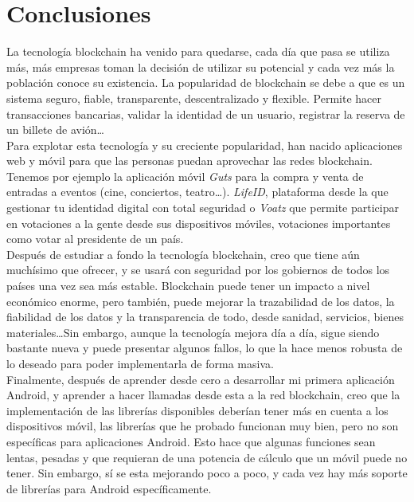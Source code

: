 \chapter{Conclusiones}
\label{cap:Conclusiones}

La tecnología blockchain ha venido para quedarse, cada día que pasa se utiliza más, más empresas toman la decisión de utilizar su potencial y cada vez más la población conoce su existencia. La popularidad de blockchain se debe a que es un sistema seguro, fiable, transparente, descentralizado y flexible. Permite hacer transacciones bancarias, validar la identidad de un usuario, registrar la reserva de un billete de avión\dots \\

Para explotar esta tecnología y su creciente popularidad, han nacido aplicaciones web y móvil para que las personas puedan aprovechar las redes blockchain. Tenemos por ejemplo la aplicación móvil \emph{Guts} para la compra y venta de entradas a eventos (cine, conciertos, teatro\dots). \emph{LifeID}, plataforma desde la que gestionar tu identidad digital con total seguridad o \emph{Voatz} que permite participar en votaciones a la gente desde sus dispositivos móviles, votaciones importantes como votar al presidente de un país. \\

Después de estudiar a fondo la tecnología blockchain, creo que tiene aún muchísimo que ofrecer, y se usará con seguridad por los gobiernos de todos los países una vez sea más estable. Blockchain puede tener un impacto a nivel económico enorme, pero también, puede mejorar la trazabilidad de los datos, la fiabilidad de los datos y la transparencia de todo, desde sanidad, servicios, bienes materiales\dots Sin embargo, aunque la tecnología mejora día a día, sigue siendo bastante nueva y puede presentar algunos fallos, lo que la hace menos robusta de lo deseado para poder implementarla de forma masiva. \\

Finalmente, después de aprender desde cero a desarrollar mi primera aplicación Android, y aprender a hacer llamadas desde esta a la red blockchain, creo que la implementación de las librerías disponibles deberían tener más en cuenta a los dispositivos móvil, las librerías que he probado funcionan muy bien, pero no son específicas para aplicaciones Android. Esto hace que algunas funciones sean lentas, pesadas y que requieran de una potencia de cálculo que un móvil puede no tener. Sin embargo, sí se esta mejorando poco a poco, y cada vez hay más soporte de librerías para Android específicamente. \\

